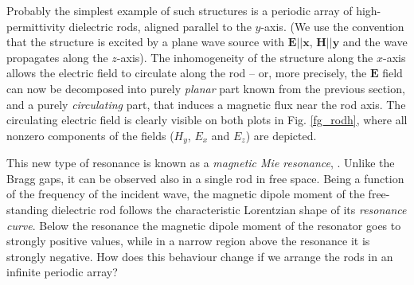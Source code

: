 {Probably the simplest example of such structures is a periodic array of high-permittivity dielectric rods, aligned parallel to the $y$-axis. (We use the convention that the structure is excited by a plane wave source with $\mathbf E || \mathbf x$, $\mathbf H || \mathbf y$ and the wave propagates along the $z$-axis). %
The inhomogeneity of the structure along the $x$-axis allows the electric field to circulate along the rod -- or, more precisely, the $\mathbf E$ field can now be decomposed into purely \textit{planar} part known from the previous section, %
and a purely \textit{circulating} part, that induces a magnetic flux near the rod axis. The circulating electric field is clearly visible on both plots in Fig. \ref{fg_rodh}, where all nonzero components of the fields ($H_y$, $E_x$ and $E_z$) are depicted. 

This new type of resonance is known as a \textit{magnetic Mie resonance}, \cite{obrien2002photonic, nemec2009tunable, yahiaoui2009broadband, yahiaoui2011tunable}. Unlike the Bragg gaps, it can be observed also in a single rod in free space. Being a function of the frequency of the incident wave, the magnetic dipole moment of the free-standing dielectric rod follows the characteristic Lorentzian shape of its \textit{resonance curve}. Below the resonance the magnetic dipole moment of the resonator goes to strongly positive values, while in a narrow region above the resonance it is strongly negative. How does this behaviour change if we arrange the rods in an infinite periodic array? 

\add{

}}
